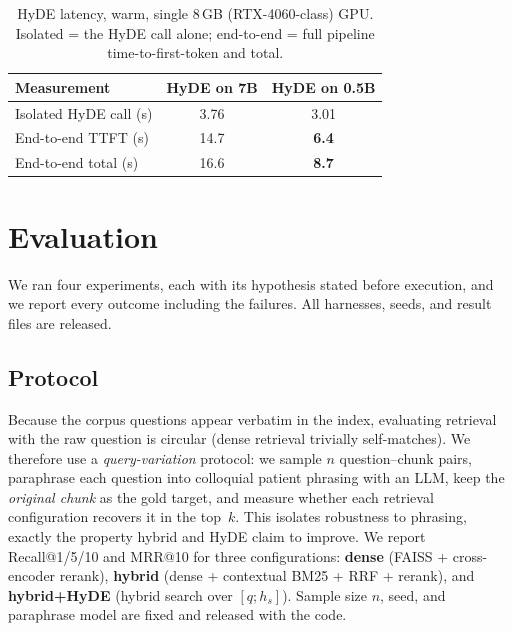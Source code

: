 \documentclass[conference]{IEEEtran}
\begin{document}
\begin{table}[t]
\caption{HyDE latency, warm, single 8\,GB (RTX-4060-class) GPU. Isolated =
the HyDE call alone; end-to-end = full pipeline time-to-first-token and total.}
\label{tab:latency}
\centering
\begin{tabular}{lcc}
\toprule
Measurement & HyDE on 7B & HyDE on 0.5B \\
\midrule
Isolated HyDE call (s)      & 3.76 & 3.01 \\
End-to-end TTFT (s)         & 14.7 & \textbf{6.4} \\
End-to-end total (s)        & 16.6 & \textbf{8.7} \\
\bottomrule
\end{tabular}
\end{table}

\section{Evaluation}\label{sec:eval}
We ran four experiments, each with its hypothesis stated before execution, and we
report every outcome including the failures. All harnesses, seeds, and result
files are released.

\subsection{Protocol}
Because the corpus questions appear verbatim in the index, evaluating retrieval
with the raw question is circular (dense retrieval trivially self-matches). We
therefore use a \emph{query-variation} protocol: we sample $n$ question--chunk
pairs, paraphrase each question into colloquial patient phrasing with an LLM,
keep the \emph{original chunk} as the gold target, and measure whether each
retrieval configuration recovers it in the top~$k$. This isolates robustness to
phrasing, exactly the property hybrid and HyDE claim to improve. We report
Recall@1/5/10 and MRR@10 for three configurations: \textbf{dense} (FAISS +
cross-encoder rerank), \textbf{hybrid} (dense + contextual BM25 + RRF + rerank),
and \textbf{hybrid+HyDE} (hybrid search over $[q;h_s]$). Sample size $n$, seed,
and paraphrase model are fixed and released with the code.
\end{document}
